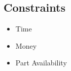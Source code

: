 \subsection{Constraints}
	\begin{itemize}
		\item Time
		\item Money
		\item Part Availability
	\end{itemize}
